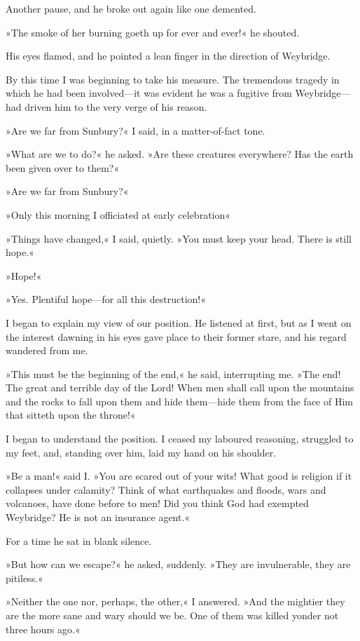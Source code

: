 Another pause, and he broke out again like one demented.

»The smoke of her burning goeth up for ever and ever!« he shouted.

His eyes flamed, and he pointed a lean finger in the direction of Weybridge.

By this time I was beginning to take his measure. The tremendous tragedy in which he had been involved—it was evident he was a fugitive from Weybridge—had driven him to the very verge of his reason.

»Are we far from Sunbury?« I said, in a matter-of-fact tone.

»What are we to do?« he asked. »Are these creatures everywhere? Has the earth been given over to them?«

»Are we far from Sunbury?«

»Only this morning I officiated at early celebration\longdash«

»Things have changed,« I said, quietly. »You must keep your head. There is still hope.«

»Hope!«

»Yes. Plentiful hope—for all this destruction!«

I began to explain my view of our position. He listened at first, but as I went on the interest dawning in his eyes gave place to their former stare, and his regard wandered from me.

»This must be the beginning of the end,« he said, interrupting me. »The end! The great and terrible day of the Lord! When men shall call upon the mountains and the rocks to fall upon them and hide them—hide them from the face of Him that sitteth upon the throne!«

I began to understand the position. I ceased my laboured reasoning, struggled to my feet, and, standing over him, laid my hand on his shoulder.

»Be a man!« said I\@. »You are scared out of your wits! What good is religion if it collapses under calamity? Think of what earthquakes and floods, wars and volcanoes, have done before to men! Did you think God had exempted Weybridge? He is not an insurance agent.«

For a time he sat in blank silence.

»But how can we escape?« he asked, suddenly. »They are invulnerable, they are pitiless.«

»Neither the one nor, perhaps, the other,« I answered. »And the mightier they are the more sane and wary should we be. One of them was killed yonder not three hours ago.«

